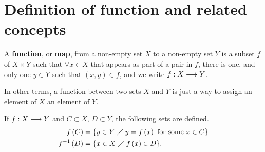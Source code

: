 \section{Definition of function and related concepts}

\begin{defi}[Function]
    A \textbf{function}, or \textbf{map}, from a non-empty set $X$ to a non-empty set $Y$ is a subset $f$ of $X\times Y$ such that $\forall x\in X$ that appears as part of a pair in $f$, there is one, and only one $y\in Y$ such that $\left( x, y \right)\in f$, and we write $f : X\longrightarrow Y$.
\end{defi}

In other terms, a function between two sets $X$ and $Y$ is just a way to assign an element of $X$ an element of $Y$.


\begin{defi}
    If $f : X\longrightarrow Y$ and $C\subset X$, $D\subset Y$, the following sets are defined.
    \begin{align}
        f\left( C \right) &= \{y\in Y\;\diagup\; y = f\left( x \right) \textrm{ for some } x\in C\} \\
        f^{-1}\left( D \right) &= \{x\in X\;\diagup\; f\left( x \right) \in D\}.
    \end{align}
\end{defi}

